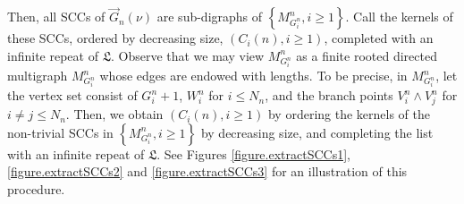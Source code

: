 Then, all SCCs of $\vec{G}_n(\nu)$ are sub-digraphs of $\left\{M^n_{G_i^n}, i\geq 1 \right\}$. Call the kernels of these SCCs, ordered by decreasing size, $(C_i(n),i\geq 1)$, completed with an infinite repeat of $\mathfrak{L}$. Observe that we may view $M^n_{G_i^n}$ as a finite rooted directed multigraph $M^n_{G_i^n}$ whose edges are endowed with lengths. To be precise, in  $M^n_{G_i^n}$, let the vertex set consist of $G_i^n+1$, $W_i^n$ for $i\leq N_n$, and the branch points $V_i^n\wedge V_j^n$ for $i\neq j\leq N_n$. Then, we obtain $(C_i(n),i\geq 1)$ by ordering the kernels of the non-trivial SCCs in $\left\{M^n_{G_i^n}, i\geq 1 \right\}$ by decreasing size, and completing the list with an infinite repeat of $\mathfrak{L}$. See Figures \ref{figure.extractSCCs1}, \ref{figure.extractSCCs2} and \ref{figure.extractSCCs3} for an illustration of this procedure.

